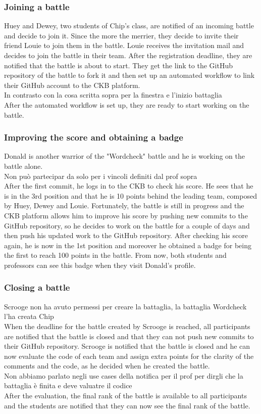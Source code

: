 \subsubsection{Joining a battle}
Huey and Dewey, two students of Chip's class, are notified of an incoming battle and decide to join it.
Since the more the merrier, they decide to invite their friend Louie to join them in the battle.
Louie receives the invitation mail and decides to join the battle in their team.
After the registration deadline, they are notified that the battle is about to start.
They get the link to the GitHub repository of the battle to fork it and then set up an automated workflow to link their GitHub account to the CKB platform.
\\ {\color{red} In contrasto con la cosa scritta sopra per la finestra e l'inizio battaglia} \\
After the automated workflow is set up, they are ready to start working on the battle.

\subsubsection{Improving the score and obtaining a badge}
Donald is another warrior of the "Wordcheck" battle and he is working on the battle alone.
\\ {\color{red} Non può partecipar da solo per i vincoli definiti dal prof sopra} \\ 
After the first commit, he logs in to the CKB to check his score.
He sees that he is in the 3rd position and that he is 10 points behind the leading team, composed by Huey, Dewey and Louie.
Fortunately, the battle is still in progress and the CKB platform allows him to improve his score by pushing new commits to the GitHub repository, so he decides to work on the battle for a couple of days and then push his updated work to the GitHub repository.
After checking his score again, he is now in the 1st position and moreover he obtained a badge for being the first to reach 100 points in the battle.
From now, both students and professors can see this badge when they visit Donald's profile.

\subsubsection{Closing a battle}
{\color{red} Scrooge non ha avuto permessi per creare la battaglia, la battaglia Wordcheck l'ha creata Chip} \\
When the deadline for the battle created by Scrooge is reached, all participants are notified that the battle is closed and that they can not push new commits to their GitHub repository.
Scrooge is notified that the battle is closed and he can now evaluate the code of each team and assign extra points for the clarity of the comments and the code, as he decided when he created the battle.
\\ {\color{red} Non abbiamo parlato negli use cases della notifica per il prof per dirgli che la battaglia è finita e deve valuatre il codice} \\
After the evaluation, the final rank of the battle is available to all participants and the students are notified that they can now see the final rank of the battle.

